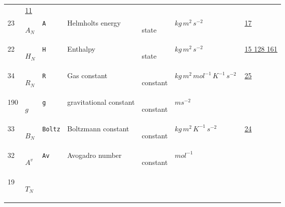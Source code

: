 \begin{longtable}{|p{1cm}|p{2.5cm}|p{4.5cm}|p{8cm}|p{3.0cm}|p{3cm}|p{1cm}|}
             &                 \hyperlink{"e:11"}{ 11 }
                 \\
            23
             & \hypertarget{"v:23"}{ $ {A}{_{N}} $}
             & \verb|A|
             & Helmholts energy
             & \begin{lay}state \end{lay}
             & $ kg \,m^{2} \,s^{-2} \, $
             &                 \hyperlink{"e:17"}{ 17 }
                 \\
            22
             & \hypertarget{"v:22"}{ $ {H}{_{N}} $}
             & \verb|H|
             & Enthalpy
             & \begin{lay}state \end{lay}
             & $ kg \,m^{2} \,s^{-2} \, $
             &                 \hyperlink{"e:15"}{ 15 }
                                 \hyperlink{"e:128"}{ 128 }
                                 \hyperlink{"e:161"}{ 161 }
                 \\
            34
             & \hypertarget{"v:34"}{ $ {R}{_{N}} $}
             & \verb|R|
             & Gas constant
             & \begin{lay}constant \end{lay}
             & $ kg \,m^{2} \,mol^{-1} \,K^{-1} \,s^{-2} \, $
             &                 \hyperlink{"e:25"}{ 25 }
                 \\
            190
             & \hypertarget{"v:190"}{ $ {g}{_{}} $}
             & \verb|g|
             & gravitational constant
             & \begin{lay}constant \end{lay}
             & $ m s^{-2} \, $
             & \\
            33
             & \hypertarget{"v:33"}{ $ {B}{_{N}} $}
             & \verb|Boltz|
             & Boltzmann constant
             & \begin{lay}constant \end{lay}
             & $ kg \,m^{2} \,K^{-1} \,s^{-2} \, $
             &                 \hyperlink{"e:24"}{ 24 }
                 \\
            32
             & \hypertarget{"v:32"}{ $ {{A^v}}{_{}} $}
             & \verb|Av|
             & Avogadro number
             & \begin{lay}constant \end{lay}
             & $ mol^{-1} \, $
             & \\
            19
             & \hypertarget{"v:19"}{ $ {T}{_{N}} $}

\end{longtable}
